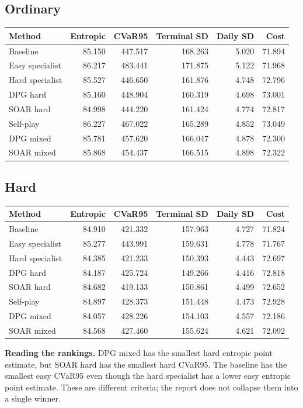 \documentclass[11pt,a4paper]{article}
\begin{document}
\subsection*{Ordinary}
\begin{footnotesize}
\begin{tabular}{lrrrrr}
\toprule
Method & Entropic & CVaR95 & Terminal SD & Daily SD & Cost \\
\midrule
Baseline & 85.150 & 447.517 & 168.263 & 5.020 & 71.894 \\
Easy specialist & 86.217 & 483.441 & 171.875 & 5.122 & 71.968 \\
Hard specialist & 85.527 & 446.650 & 161.876 & 4.748 & 72.796 \\
DPG hard & 85.160 & 448.904 & 160.319 & 4.698 & 73.001 \\
SOAR hard & 84.998 & 444.220 & 161.424 & 4.774 & 72.817 \\
Self-play & 86.227 & 467.022 & 165.289 & 4.852 & 73.049 \\
DPG mixed & 85.781 & 457.620 & 166.047 & 4.878 & 72.300 \\
SOAR mixed & 85.868 & 454.437 & 166.515 & 4.898 & 72.322 \\
\bottomrule
\end{tabular}
\end{footnotesize}\par\medskip

\subsection*{Hard}
\begin{footnotesize}
\begin{tabular}{lrrrrr}
\toprule
Method & Entropic & CVaR95 & Terminal SD & Daily SD & Cost \\
\midrule
Baseline & 84.910 & 421.332 & 157.963 & 4.727 & 71.824 \\
Easy specialist & 85.277 & 443.991 & 159.631 & 4.778 & 71.767 \\
Hard specialist & 84.385 & 421.233 & 150.393 & 4.443 & 72.697 \\
DPG hard & 84.187 & 425.724 & 149.266 & 4.416 & 72.818 \\
SOAR hard & 84.682 & 419.133 & 150.861 & 4.499 & 72.652 \\
Self-play & 84.897 & 428.373 & 151.448 & 4.473 & 72.928 \\
DPG mixed & 84.057 & 428.226 & 154.103 & 4.557 & 72.186 \\
SOAR mixed & 84.568 & 427.460 & 155.624 & 4.621 & 72.092 \\
\bottomrule
\end{tabular}
\end{footnotesize}\par\medskip
\textbf{Reading the rankings.} DPG mixed has the smallest hard entropic point estimate, but SOAR hard has the smallest hard CVaR95. The baseline has the smallest easy CVaR95 even though the hard specialist has a lower easy entropic point estimate. These are different criteria; the report does not collapse them into a single winner.
\end{document}
